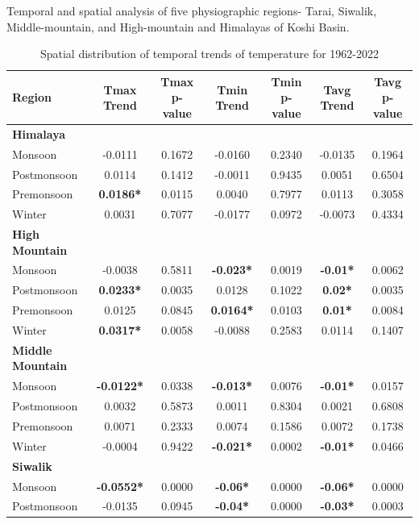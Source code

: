 
Temporal and spatial analysis of five physiographic regions- Tarai, Siwalik, Middle-mountain, and High-mountain and Himalayas of Koshi Basin.

\begin{table}[htbp]
  \centering
  \caption{Spatial distribution of temporal trends of temperature for 1962-2022}
  \begin{tabular}{@{}lcccccc@{}}
      \toprule
      Region & Tmax Trend & Tmax p-value & Tmin Trend & Tmin p-value & Tavg Trend & Tavg p-value \\ 
      \midrule
      \textbf{Himalaya} & & & & & & \\ 
      Monsoon & -0.0111 & 0.1672 & -0.0160 & 0.2340 & -0.0135 & 0.1964 \\ 
      Postmonsoon & 0.0114 & 0.1412 & -0.0011 & 0.9435 & 0.0051 & 0.6504 \\ 
      Premonsoon & \textbf{0.0186*} & 0.0115 & 0.0040 & 0.7977 & 0.0113 & 0.3058 \\ 
      Winter & 0.0031 & 0.7077 & -0.0177 & 0.0972 & -0.0073 & 0.4334 \\ 
      \midrule
      \textbf{High Mountain} & & & & & & \\ 
      Monsoon & -0.0038 & 0.5811 & \textbf{-0.023*} & 0.0019 & \textbf{-0.01*} & 0.0062 \\ 
      Postmonsoon & \textbf{0.0233*} & 0.0035 & 0.0128 & 0.1022 & \textbf{0.02*} & 0.0035 \\ 
      Premonsoon & 0.0125 & 0.0845 & \textbf{0.0164*} & 0.0103 & \textbf{0.01*} & 0.0084 \\ 
      Winter & \textbf{0.0317*} & 0.0058 & -0.0088 & 0.2583 & 0.0114 & 0.1407 \\ 
      \midrule
      \textbf{Middle Mountain} & & & & & & \\ 
      Monsoon & \textbf{-0.0122*} & 0.0338 & \textbf{-0.013*} & 0.0076 & \textbf{-0.01*} & 0.0157 \\ 
      Postmonsoon & 0.0032 & 0.5873 & 0.0011 & 0.8304 & 0.0021 & 0.6808 \\ 
      Premonsoon & 0.0071 & 0.2333 & 0.0074 & 0.1586 & 0.0072 & 0.1738 \\ 
      Winter & -0.0004 & 0.9422 & \textbf{-0.021*} & 0.0002 & \textbf{-0.01*} & 0.0466 \\ 
      \midrule
      \textbf{Siwalik} & & & & & & \\ 
      Monsoon & \textbf{-0.0552*} & 0.0000 & \textbf{-0.06*} & 0.0000 & \textbf{-0.06*} & 0.0000 \\ 
      Postmonsoon & -0.0135 & 0.0945 & \textbf{-0.04*} & 0.0000 & \textbf{-0.03*} & 0.0003 \\ 

\end{tabular}
\end{table}
